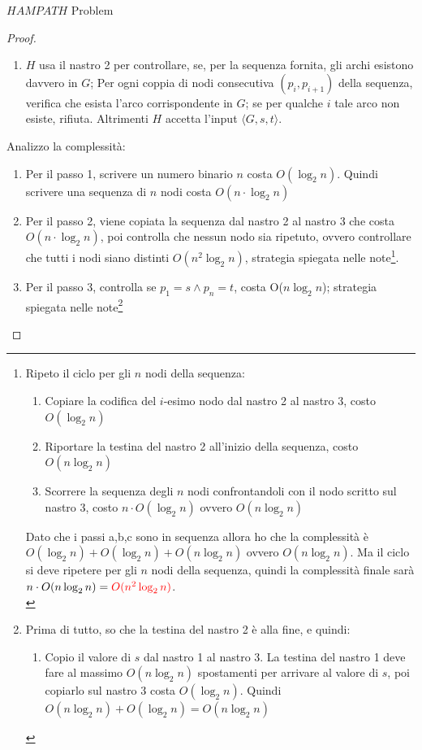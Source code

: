 \documentclass{article}  %
\theoremstyle{definition}
\begin{document}
\begin{theorem}{$HAMPATH$ Problem}
\begin{proof}
\begin{enumerate}
			\item $H$ usa il nastro 2 per controllare, se, per la sequenza fornita, gli archi esistono davvero in $G$;
			      Per ogni coppia di nodi consecutiva $(p_i, p_{i+1})$ della sequenza, verifica che esista l'arco corrispondente in $G$; se
			      per qualche $i$ tale arco non esiste, rifiuta. Altrimenti $H$ accetta l'input $\langle G,s,t \rangle$.
		\end{enumerate}
		Analizzo la complessità:
		\begin{enumerate}
			\item Per il passo 1, scrivere un numero binario $n$ costa $O(\log_2n)$. Quindi scrivere una sequenza di $n$ nodi costa $O(n \cdot \log_2n)$
			\item Per il passo 2, viene copiata la sequenza dal nastro 2 al nastro 3 che costa $O(n \cdot \log_2n)$, poi controlla che nessun nodo
			      sia ripetuto, ovvero controllare che tutti i nodi siano distinti $O(n^2\log_2n)$, strategia spiegata nelle note\footnote{
				      Ripeto il ciclo per gli $n$ nodi della sequenza:
				      \begin{enumerate}
					      \item Copiare la codifica del $i$-esimo nodo dal nastro 2 al nastro 3, costo $O(\log_2n)$
					      \item Riportare la testina del nastro 2 all'inizio della sequenza, costo $O(n\log_2n)$
					      \item Scorrere la sequenza degli $n$ nodi confrontandoli con il nodo scritto sul nastro 3, costo $n\cdot O(\log_2n)$ ovvero $O(n \log_2n)$
				      \end{enumerate}
				      Dato che i passi a,b,c sono in sequenza allora ho che la complessità è $O(\log_2n)+O(\log_2n)+O(n\log_2n)$ ovvero $O(n\log_2n)$. Ma il ciclo
				      si deve ripetere per gli $n$ nodi della sequenza, quindi la complessità finale sarà $n\cdot O(n\log_2n)=\textcolor{red}{O(n^2\log_2n)}$. \\
			      }.
			\item Per il passo 3, controlla se $p_1=s \land p_n=t$, costa O($n\log_2n$); strategia spiegata nelle note\footnote{
				      Prima di tutto, so che la testina del nastro 2 è alla fine, e quindi:
				      \begin{enumerate}
					      \item Copio il valore di $s$ dal nastro 1 al nastro 3. La testina del nastro 1 deve fare al massimo $O(n\log_2n)$ spostamenti
					            per arrivare al valore di $s$, poi copiarlo sul nastro 3 costa $O(\log_2n)$. Quindi $O(n\log_2n)+O(\log_2n)=O(n\log_2n)$

\end{enumerate}}
\end{enumerate}
\end{proof}
\end{theorem}
\end{document}
